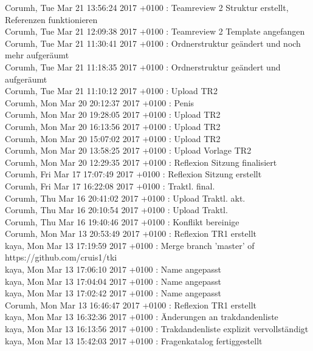Corumh, Tue Mar 21 13:56:24 2017 +0100 : Teamreview 2 Struktur erstellt, Referenzen funktionieren\\
Corumh, Tue Mar 21 12:09:38 2017 +0100 : Teamreview 2 Template angefangen\\
Corumh, Tue Mar 21 11:30:41 2017 +0100 : Ordnerstruktur geändert und noch mehr aufgeräumt\\
Corumh, Tue Mar 21 11:18:35 2017 +0100 : Ordnerstruktur geändert und aufgeräumt\\
Corumh, Tue Mar 21 11:10:12 2017 +0100 : Upload TR2\\
Corumh, Mon Mar 20 20:12:37 2017 +0100 : Penis\\
Corumh, Mon Mar 20 19:28:05 2017 +0100 : Upload TR2\\
Corumh, Mon Mar 20 16:13:56 2017 +0100 : Upload TR2\\
Corumh, Mon Mar 20 15:07:02 2017 +0100 : Upload TR2\\
Corumh, Mon Mar 20 13:58:25 2017 +0100 : Upload Vorlage TR2\\
Corumh, Mon Mar 20 12:29:35 2017 +0100 : Reflexion Sitzung finalisiert\\
Corumh, Fri Mar 17 17:07:49 2017 +0100 : Reflexion Sitzung erstellt\\
Corumh, Fri Mar 17 16:22:08 2017 +0100 : Traktl. final.\\
Corumh, Thu Mar 16 20:41:02 2017 +0100 : Upload Traktl. akt.\\
Corumh, Thu Mar 16 20:10:54 2017 +0100 : Upload Traktl.\\
Corumh, Thu Mar 16 19:40:46 2017 +0100 : Konflikt bereinige\\
Corumh, Mon Mar 13 20:53:49 2017 +0100 : Reflexion TR1 erstellt\\
kaya, Mon Mar 13 17:19:59 2017 +0100 : Merge branch 'master' of https://github.com/cruis1/tki\\
kaya, Mon Mar 13 17:06:10 2017 +0100 : Name angepasst\\
kaya, Mon Mar 13 17:04:04 2017 +0100 : Name angepasst\\
kaya, Mon Mar 13 17:02:42 2017 +0100 : Name angepasst\\
Corumh, Mon Mar 13 16:46:47 2017 +0100 : Reflexion TR1 erstellt\\
kaya, Mon Mar 13 16:32:36 2017 +0100 : Änderungen an trakdandenliste\\
kaya, Mon Mar 13 16:13:56 2017 +0100 : Trakdandenliste explizit vervollständigt\\
kaya, Mon Mar 13 15:42:03 2017 +0100 : Fragenkatalog fertiggestellt\\
